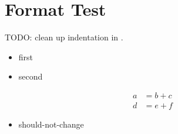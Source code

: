 \documentclass{article}
\newenvironment{myverbatim}{\verbatim}{\endverbatim}
\begin{document}
  \section{Format Test}
    TODO: clean up indentation in .
  \begin{itemize}
  \item first
      \item second
\end{itemize}
\begin{align}
  a&=b+c\\
   d &= e + f
\end{align}
\begin{myverbatim}
\begin{itemize}
\item should-not-change
\end{itemize}
\end{myverbatim}
\end{document}

